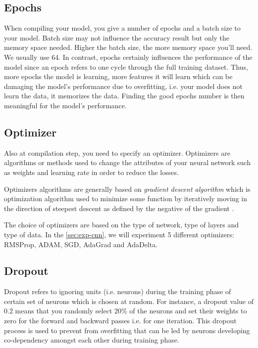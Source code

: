 \documentclass[11pt, openany]{report}
\theoremstyle{plain}
\theoremstyle{definition}
\theoremstyle{remark}
\begin{document}
\subsection{Epochs}
When compiling your model, you give a number of epochs and a batch size to your model. Batch size may not influence the accuracy result but only the memory space needed. Higher the batch size, the more memory space you'll need. We usually use 64. In contrast, epochs certainly influences the performance of the model since an epoch refers to one cycle through the full training dataset. Thus, more epochs the model is learning, more features it will learn which can be damaging the model's performance due to overfitting, i.e. your model does not learn the data, it memorizes the data. Finding the good epochs number is then meaningful for the model's performance. 


\subsection{Optimizer}
Also at compilation step, you need to specify an optimizer. Optimizers are algorithms or methods used to change the attributes of your neural network such as weights and learning rate in order to reduce the losses. 

Optimizers algorithms are generally based on \textit{gradient descent algorithm} which is optimization algorithm used to minimize some function by iteratively moving in the direction of steepest descent as defined by the negative of the gradient \cite{gradient}. 

The choice of optimizers are based on the type of network, type of layers and type of data. In the \autoref{sec:exp-cnn}, we will experiment 5 different optimizers: RMSProp, ADAM, SGD, AdaGrad and AdaDelta. %

\subsection{Dropout}
Dropout refers to ignoring units (i.e. neurons) during the training phase of certain set of neurons which is chosen at random. For instance, a dropout value of 0.2 means that you randomly select 20\% of the neurons and set their weights to zero for the forward and backward passes i.e. for one iteration. This dropout process is used to prevent from overfitting that can be led by neurons developing co-dependency amongst each other during training phase. 
\end{document}
